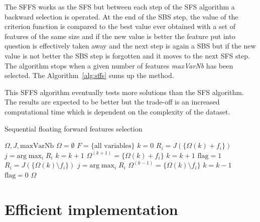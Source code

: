 \documentclass[journal,peerreview,onecolumn]{IEEEtran}
\begin{document}
            The SFFS works as the SFS but between each step of the SFS algorithm a backward selection is operated. At the end of the SBS step, the value of the criterion function is compared to the best value ever obtained with a set of features of the same size and if the new value is better the feature put into question is effectively taken away and the next step is again a SBS but if the new value is not better the SBS step is forgotten and it moves to the next SFS step. The algorithm stops when a given number of features \emph{maxVarNb} has been selected. The Algorithm~\ref{alg:sffs} sums up the method.

            This SFFS algorithm eventually tests more solutions than the SFS algorithm. The results are expected to be better but the trade-off is an increased computational time which is dependent on the complexity of the dataset.

            \begin{algorithm}
            \caption{Sequential floating forward features selection\label{alg:sffs}}
            {\footnotesize
            \begin{algorithmic}[1]
            \REQUIRE $\Omega,J,\text{maxVarNb}$
            \STATE $\Omega=\emptyset$
            \STATE $F=\text{\{all variables\}}$
            \STATE $k=0$
            \STATE $R_i = J(\{\Omega{(k)} + f_i\})$
            \ENDFOR
            \STATE $j=\text{arg} \max_{i} R_i$
            \STATE $k=k+1$
            \ELSE
            \STATE $\Omega^{(k+1)} = \{\Omega{(k)} + f_i\}$
            \STATE $k=k+1$
            \STATE $\text{flag}=1$
            \STATE $R_i = J(\{\Omega{(k)}\setminus f_i\})$
            \ENDFOR
            \STATE $j=\text{arg} \max_{i} R_i$
            \STATE $\Omega^{(k-1)} = \{\Omega{(k)} \setminus f_i\}$
            \STATE $k=k-1$
            \ELSE
            \STATE $\text{flag}=0$
            \ENDIF
            \ENDWHILE
            \ENDIF
            \ENDWHILE
            \RETURN $\Omega$
            \end{algorithmic}
            }
            \end{algorithm}


\section{Efficient implementation}
\label{sec:implementation}
\end{document}
